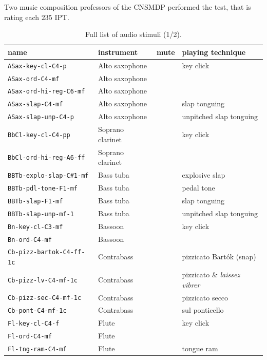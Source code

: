 \documentclass{bmcart}
\newcommand{\ipt}{IPT\xspace}
\begin{document}
\begin{backmatter}
Two music composition professors of the CNSMDP performed the test, that is rating each $235$ \ipt.

\begin{table}
  \label{tab:list1}
\caption{Full list of audio stimuli (1/2).}
      \begin{tabular}{llll}
          name & instrument  & mute   &  playing technique \\ \hline \hline
        \texttt{ASax-key-cl-C4-p} & Alto saxophone & & key click \\
        \texttt{ASax-ord-C4-mf} & Alto saxophone &  &  \\
        \texttt{ASax-ord-hi-reg-C6-mf} & Alto saxophone &   & \\
        \texttt{ASax-slap-C4-mf} & Alto saxophone & & slap tonguing \\
        \texttt{ASax-slap-unp-C4-p} & Alto saxophone & & unpitched slap tonguing \\ \hline
        \texttt{BbCl-key-cl-C4-pp} & Soprano clarinet & & key click \\
        \texttt{BbCl-ord-hi-reg-A6-ff} & Soprano clarinet & & \\ \hline
        \texttt{BBTb-explo-slap-C\#1-mf} & Bass tuba &  & explosive slap \\
		\texttt{BBTb-pdl-tone-F1-mf} & Bass tuba & & pedal tone \\
		\texttt{BBTb-slap-F1-mf} & Bass tuba & & slap tonguing \\
		\texttt{BBTb-slap-unp-mf-1} & Bass tuba & & unpitched slap tonguing \\ \hline
		\texttt{Bn-key-cl-C3-mf} & Bassoon & & key click \\
		\texttt{Bn-ord-C4-mf} & Bassoon & & \\ \hline
		\texttt{Cb-pizz-bartok-C4-ff-1c} & Contrabass & & pizzicato Bart\'ok (snap) \\
		\texttt{Cb-pizz-lv-C4-mf-1c} & Contrabass & & pizzicato \& \emph{laissez vibrer} \\
        \texttt{Cb-pizz-sec-C4-mf-1c} & Contrabass & & pizzicato secco \\
        \texttt{Cb-pont-C4-mf-1c} & Contrabass & & sul ponticello \\ \hline
        \texttt{Fl-key-cl-C4-f} & Flute & & key click \\
        \texttt{Fl-ord-C4-mf} & Flute & & \\
        \texttt{Fl-tng-ram-C4-mf} & Flute & & tongue ram \\ \hline

\end{tabular}
\end{table}
\end{backmatter}
\end{document}

